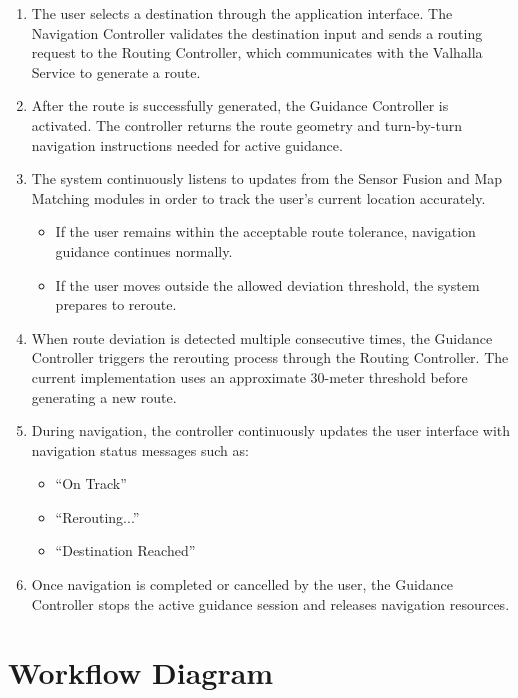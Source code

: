 \documentclass{article}
\begin{document}
\begin{enumerate}
    \item The user selects a destination through the application interface. The Navigation Controller validates the destination input and sends a routing request to the Routing Controller, which communicates with the Valhalla Service to generate a route.
    \item After the route is successfully generated, the Guidance Controller is activated. The controller returns the route geometry and turn-by-turn navigation instructions needed for active guidance.
    \item The system continuously listens to updates from the Sensor Fusion and Map Matching modules in order to track the user’s current location accurately.
    \begin{itemize}
        \item If the user remains within the acceptable route tolerance, navigation guidance continues normally.
        \item If the user moves outside the allowed deviation threshold, the system prepares to reroute.
    \end{itemize}
    \item When route deviation is detected multiple consecutive times, the Guidance Controller triggers the rerouting process through the Routing Controller. The current implementation uses an approximate 30-meter threshold before generating a new route.
    \item During navigation, the controller continuously updates the user interface with navigation status messages such as:
    \begin{itemize}
        \item ``On Track''
        \item ``Rerouting...''
        \item ``Destination Reached''
    \end{itemize}
    \item Once navigation is completed or cancelled by the user, the Guidance Controller stops the active guidance session and releases navigation resources.
\end{enumerate}

\newpage
\section{Workflow Diagram}
\end{document}
